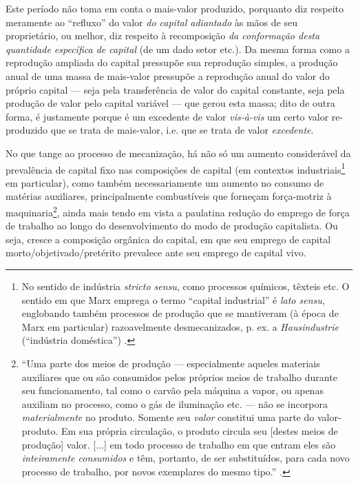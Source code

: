 \documentclass[12pt]{article}
\numberwithin{equation}{section}
\theoremstyle{plain}
\theoremstyle{definition}
\theoremstyle{remark}
\begin{document}
Este período não toma em conta o mais-valor produzido, porquanto diz respeito meramente ao ``refluxo'' do valor \textit{do capital adiantado} às mãos de seu proprietário, ou melhor, diz respeito à recomposição \textit{da conformação desta quantidade específica de capital} (de um dado setor etc.). Da mesma forma como a reprodução ampliada do capital pressupõe sua reprodução simples, a produção anual de uma massa de mais-valor pressupõe a reprodução anual do valor do próprio capital --- seja pela transferência de valor do capital constante, seja pela produção de valor pelo capital variável --- que gerou esta massa; dito de outra forma, é justamente porque é um excedente de valor \textit{vis-à-vis} um certo valor re-produzido que se trata de mais-valor, i.e. que se trata de valor \textit{excedente}. 

No que tange ao processo de mecanização, há não só um aumento considerável da prevalência de capital fixo nas composições de capital (em contextos industriais\footnote{No sentido de indústria \textit{stricto sensu}, como processos químicos, têxteis etc. O sentido em que Marx emprega o termo ``capital industrial'' é \textit{lato sensu}, englobando também processos de produção que se mantiveram (à época de Marx em particular) razoavelmente desmecanizados, p. ex. a \textit{Hausindustrie} (``indústria doméstica'') \parencite{Marx2017}.} em particular), como também necessariamente um aumento no consumo de matérias auxiliares, principalmente combustíveis que forneçam força-motriz à maquinaria\footnote{``Uma parte dos meios de produção — especialmente aqueles materiais auxiliares que ou são consumidos pelos próprios meios de trabalho durante seu funcionamento, tal como o carvão pela máquina a vapor, ou apenas auxiliam no processo, como o gás de iluminação etc. — não se incorpora \textit{materialmente} no produto. Somente seu \textit{valor} constitui uma parte do valor-produto. Em sua própria circulação, o produto circula seu [destes meios de produção] valor. [...] em todo processo de trabalho em que entram eles são \textit{inteiramente consumidos} e têm, portanto, de ser substituídos, para cada novo processo de trabalho, por novos exemplares do mesmo tipo.'' \parencite[p. 241, grifo meu]{Marx2014}.}, ainda mais tendo em vista a paulatina redução do emprego de força de trabalho ao longo do desenvolvimento do modo de produção capitalista. Ou seja, cresce a composição orgânica do capital, em que seu emprego de capital morto/objetivado/pretérito prevalece ante seu emprego de capital vivo. 
\end{document}
